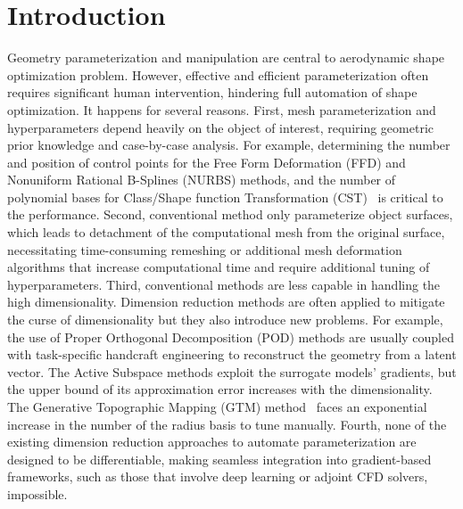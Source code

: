 
\section{Introduction}
Geometry parameterization and manipulation are central to aerodynamic shape optimization problem.
However, effective and efficient parameterization often requires significant human intervention, hindering full automation of shape optimization.
It happens for several reasons.
First, mesh parameterization and hyperparameters depend heavily on the object of interest, requiring geometric prior knowledge and case-by-case analysis.
For example, determining the number and position of control points for the Free Form Deformation (FFD) \cite{aa.Sederberg1986, aa.Lamousin1994, aa.Kenway2010} and Nonuniform Rational B-Splines (NURBS) \cite{aa.Toal2010} methods, and the number of polynomial bases for Class/Shape function Transformation (CST)~\cite{aa.Kulfan2008} is critical to the performance.
Second, conventional method only parameterize object surfaces, which leads to detachment of the computational mesh from the original surface, necessitating time-consuming remeshing or additional mesh deformation algorithms \cite{aa.deBoer2007, aa.Batina1990, aa.Batina1991, aa.Farhat1998, aa.Luke2012} that increase computational time and require additional tuning of hyperparameters.
Third, conventional methods are less capable in handling the high dimensionality. 
Dimension reduction methods are often applied to mitigate the curse of dimensionality \cite{ai.Bellman1961} but they also introduce new problems.
For example, the use of Proper Orthogonal Decomposition (POD) methods \cite{aa.Robinson2001,aa.Poole2015, aa.Masters2017,aa.Li2019,aa.Kedward2020} are usually coupled with task-specific handcraft engineering to reconstruct the geometry from a latent vector.
The Active Subspace methods \cite{aa.Constantine2014,aa.Li2019b,aa.Lukaczyk2014,aa.Namura2017,aa.Grey2018,aa.Bauerheim2016,aa.Magri2016} exploit the surrogate models' gradients, but the upper bound of its approximation error increases with the dimensionality.
The Generative Topographic Mapping (GTM) method~\cite{aa.Viswanath2011} faces an exponential increase in the number of the radius basis to tune manually.
Fourth, none of the existing dimension reduction approaches to automate parameterization \cite{aa.Robinson2001, aa.Poole2015, aa.Masters2017, aa.Li2019, aa.Kedward2020, aa.Viswanath2011, aa.Constantine2014} are designed to be differentiable, making seamless integration into gradient-based frameworks, such as those that involve deep learning or adjoint CFD solvers, impossible.

